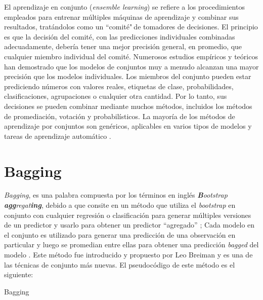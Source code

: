 El aprendizaje en conjunto (\textit{ensemble learning}) se refiere a los procedimientos empleados para entrenar múltiples máquinas de aprendizaje y combinar sus resultados, tratándolos como un ``comité"$~$de tomadores de decisiones. 
El principio es que la decisión del comité, con las predicciones individuales combinadas adecuadamente, debería tener una mejor precisión general, en promedio, que cualquier miembro individual del comité. 
Numerosos estudios empíricos y teóricos han demostrado que los modelos de conjuntos muy a menudo alcanzan una mayor precisión que los modelos individuales.
Los miembros del conjunto pueden estar prediciendo números con valores reales, etiquetas de clase, probabilidades, clasificaciones, agrupaciones o cualquier otra cantidad. Por lo tanto, 
sus decisiones se pueden combinar mediante muchos métodos, incluidos los métodos de promediación, votación y probabilísticos. La mayoría de los métodos de aprendizaje por conjuntos son genéricos, 
aplicables en varios tipos de modelos y tareas de aprendizaje automático \cite{6}.


\section{Bagging}
\textit{Bagging}, es una palabra compuesta por los términos en inglés \textit{\textbf{B}ootstrap \textbf{agg}regat\textbf{ing}}, 
debido a que consite en un método que utiliza el \textit{bootstrap} en conjunto con cualquier regresión o clasificación
para generar múltiples versiones de un predictor y usarlo para obtener un predictor ``agregado'' \cite{22}; Cada modelo en el conjunto es utilizado para generar una predicción de una observación en particular 
y luego se promedian entre ellas para obtener una predicción \textit{bagged} del modelo .
Este método fue introducido y propuesto por Leo Breiman y es una de las técnicas
de conjunto más nuevas. El pseudocódigo de este método es el siguiente:

\begin{algorithm}[H]
    \caption{Bagging}

    \begin{algorithmic}[1]
        \ENDFOR

    \end{algorithmic}
\end{algorithm}

